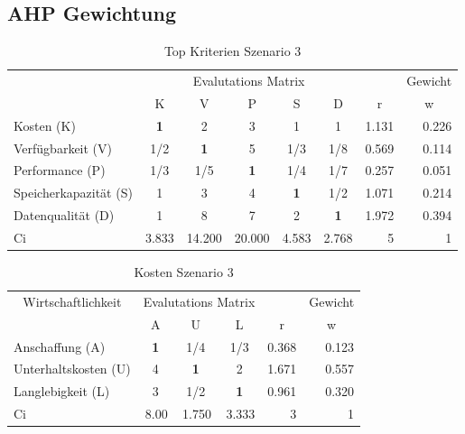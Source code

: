 
\subsection{AHP Gewichtung}
\begin{table}[htbp]
\caption{Top Kriterien Szenario 3}
\begin{tabular}{|l|c|c|c|c|c|r|r|}
\hline
\multicolumn{ 1}{|c|}{} & \multicolumn{ 5}{c|}{Evalutations Matrix} & \multicolumn{1}{l|}{} & \multicolumn{1}{l|}{Gewicht} \\ \cline{ 2- 8}
\multicolumn{ 1}{|c|}{} & K & V & P & S & D & \multicolumn{1}{c|}{r} & \multicolumn{1}{c|}{w} \\ \hline
Kosten (K) & \textbf{1} & 2 & 3 & 1 & 1 & 1.131 & 0.226 \\ \hline
Verfügbarkeit (V) &  1/2 & \textbf{1} & 5 &  1/3 &  1/8 & 0.569 & 0.114 \\ \hline
Performance (P) &  1/3 &  1/5 & \textbf{1} &  1/4 &  1/7 & 0.257 & 0.051 \\ \hline
Speicherkapazität (S) & 1 & 3 & 4 & \textbf{1} &  1/2 & 1.071 & 0.214 \\ \hline
Datenqualität (D) & 1 & 8 & 7 & 2 & \textbf{1} & 1.972 & 0.394 \\ \hline  \hline
Ci & \multicolumn{1}{r|}{3.833} & \multicolumn{1}{r|}{14.200} & \multicolumn{1}{r|}{20.000} & \multicolumn{1}{r|}{4.583} & \multicolumn{1}{r|}{2.768} & 5 & 1 \\ \hline 
\end{tabular}
\label{AHPTopKriterienS3}
\end{table}


\begin{table}[htbp]
\caption{Kosten Szenario 3}
\begin{tabular}{|l|c|c|c|r|r|}
\hline
\multicolumn{ 1}{|c|}{Wirtschaftlichkeit} & \multicolumn{ 3}{c|}{Evalutations Matrix} & \multicolumn{1}{l|}{} & \multicolumn{1}{l|}{Gewicht} \\ \cline{ 2- 6}
\multicolumn{ 1}{|c|}{} & A & U & L & \multicolumn{1}{c|}{r} & \multicolumn{1}{c|}{w} \\ \hline
Anschaffung (A) & \textbf{1} &  1/4 &  1/3 & 0.368 & 0.123 \\ \hline
Unterhaltskosten (U)  & 4 & \textbf{1} & 2 & 1.671 & 0.557 \\ \hline
Langlebigkeit (L) & 3 &  1/2 & \textbf{1} & 0.961 & 0.320 \\ \hline \hline 
Ci & \multicolumn{1}{r|}{8.00} & \multicolumn{1}{r|}{1.750} & \multicolumn{1}{r|}{3.333} & 3 & 1 \\ \hline
\end{tabular}
\label{AHPKostenS3}
\end{table}

